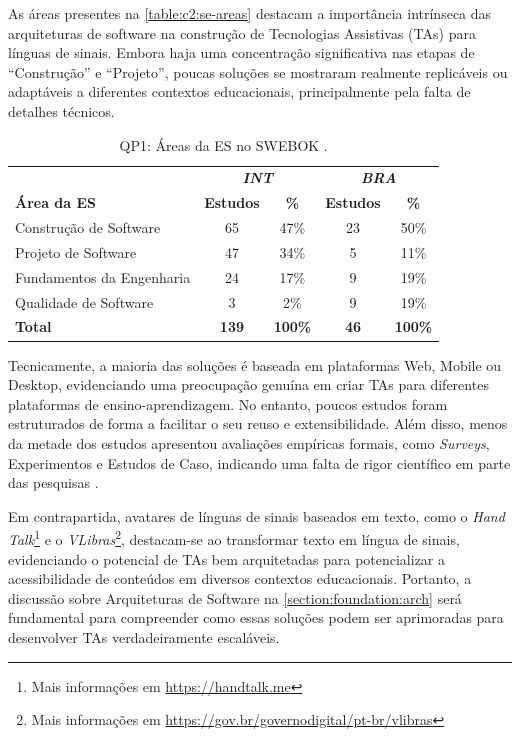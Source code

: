 As áreas presentes na \autoref{table:c2:se-areas} destacam a importância intrínseca das arquiteturas de software na construção de Tecnologias Assistivas (TAs) para línguas de sinais. Embora haja uma concentração significativa nas etapas de ``Construção'' e ``Projeto'', poucas soluções se mostraram realmente replicáveis ou adaptáveis a diferentes contextos educacionais, principalmente pela falta de detalhes técnicos.

\begin{table}[htb]
\caption{QP1: Áreas da ES no SWEBOK \cite{Bourque2014}.}
\label{table:c2:se-areas}
\centering
\begin{tabular}{l|cc|cc} \hline
 & \multicolumn{2}{c|}{\textit{\textbf{INT}}} & \multicolumn{2}{c}{\textit{\textbf{BRA}}} \\ \cline{2-5} 
\textbf{Área da ES} & \textbf{Estudos} & \textbf{\%} & \textbf{Estudos} & \textbf{\%} \\ \hline
Construção de Software & 65 & 47\% & 23 & 50\% \\
Projeto de Software & 47 & 34\% & 5 & 11\% \\
Fundamentos da Engenharia & 24 & 17\% & 9 & 19\% \\
Qualidade de Software & 3 & 2\% & 9 & 19\% \\ \hline
\textbf{Total} & \textbf{139} & \textbf{100\%} & \textbf{46} & \textbf{100\%} \\ \hline
\end{tabular}
\end{table}

Tecnicamente, a maioria das soluções é baseada em plataformas Web, Mobile ou Desktop, evidenciando uma preocupação genuína em criar TAs para diferentes plataformas de ensino-aprendizagem. No entanto, poucos estudos foram estruturados de forma a facilitar o seu reuso e extensibilidade. Além disso, menos da metade dos estudos apresentou avaliações empíricas formais, como \textit{Surveys}, Experimentos e Estudos de Caso, indicando uma falta de rigor científico em parte das pesquisas \cite{Pressman2016, Sommerville2015}.

Em contrapartida, avatares de línguas de sinais baseados em texto, como o \textit{Hand Talk}\footnote{Mais informações em \url{https://handtalk.me}} e o \textit{VLibras}\footnote{Mais informações em \url{https://gov.br/governodigital/pt-br/vlibras}}, destacam-se ao transformar texto em língua de sinais, evidenciando o potencial de TAs bem arquitetadas para potencializar a acessibilidade de conteúdos em diversos contextos educacionais. Portanto, a discussão sobre Arquiteturas de Software na \autoref{section:foundation:arch} será fundamental para compreender como essas soluções podem ser aprimoradas para desenvolver TAs verdadeiramente escaláveis.


